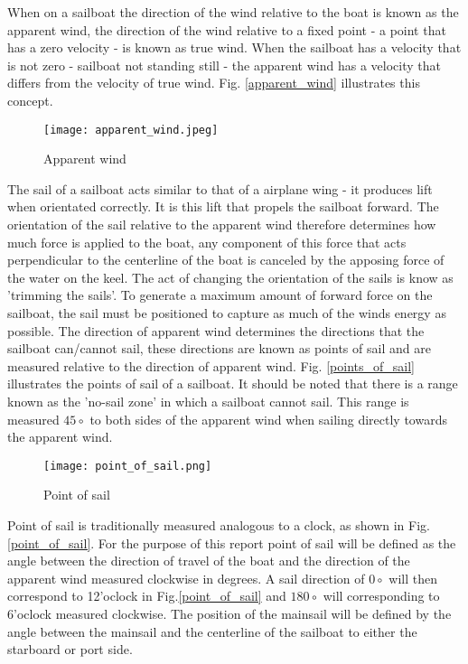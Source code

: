 When on a sailboat the direction of the wind relative to the boat is known as the apparent wind, the direction of the wind relative to a fixed point - 
a point that has a zero velocity - is known as true wind. When the sailboat has a velocity that is not zero - sailboat not standing still - the apparent 
wind has a velocity that differs from the velocity of true wind. Fig. \ref{apparent_wind} illustrates this concept. 

\begin{figure}
    \centering
    \texttt{[image: apparent\_wind.jpeg]}
    \caption[Apparent wind]{Apparent wind\cite{apparent_wind} }
    \label{fig:apparent_wind}
\end{figure}


The sail of a sailboat acts similar to that of a airplane wing - it produces lift when orientated correctly. It is this lift that propels the sailboat 
forward. The orientation of the sail relative to the apparent wind therefore determines how much force is applied to the boat, any component of this force
that acts perpendicular to the centerline of the boat is canceled by the apposing force of the water on the keel. The act of changing the orientation of 
the sails is know as 'trimming the sails'. To generate a maximum amount of forward force on the sailboat, the sail must be positioned to capture as much 
of the winds energy as possible. The direction of apparent wind determines the directions that the sailboat can/cannot sail, these directions are known as 
points of sail and are measured relative to the direction of apparent wind. Fig. \ref{points_of_sail} illustrates the points of sail of a sailboat. It should 
be noted that there is a range known as the 'no-sail zone' in which a sailboat cannot sail. This range is measured $45\circ$ to both sides of the apparent wind
when sailing directly towards the apparent wind.

\begin{figure}[!h]
    \centering
    \texttt{[image: point\_of\_sail.png]}
    \caption[Point of sail]{Point of sail\cite{ASA} }
    \label{fig:point_of_sail}
\end{figure}

Point of sail is traditionally measured analogous to a clock, as shown in Fig. \ref{point_of_sail}. For the purpose of this report point of sail will be defined 
as the angle between the direction of travel of the boat and the direction of the apparent wind measured clockwise in degrees. A sail direction of $0\circ$ will 
then correspond to 12'oclock in Fig.\ref{point_of_sail} and $180\circ$ will corresponding to 6'oclock measured clockwise. The position of the mainsail will be 
defined by the angle between the mainsail and the centerline of the sailboat to either the starboard or port side.

